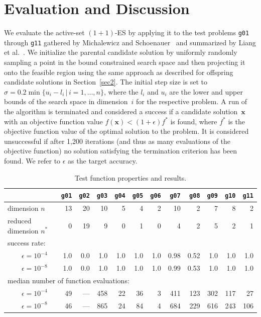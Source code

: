 \documentclass[oribibl]{llncs}
\newcommand{\x}{\ensuremath{\mathbf{x}}}
\begin{document}
\section{\label{sec3}Evaluation and Discussion}

We evaluate the active-set $(1+1)$-ES by applying it to the test problems \texttt{g01} through \texttt{g11} gathered by Michalewicz and Schoenauer~\cite{MS96} and summarized by Liang et al.~\cite{CEC06}. We initialize the parental candidate solution by uniformly randomly sampling a point in the bound constrained search space and then projecting it onto the feasible region using the same approach as described for offspring candidate solutions in Section~\ref{sec2}. The initial step size is set to $\sigma=0.2\min\{u_i-l_i\,|\,i=1,\dots,n\}$, where the $l_i$ and $u_i$ are the lower and upper bounds of the search space in dimension~$i$ for the respective problem. A run of the algorithm is terminated and considered a success if a candidate solution~$\x$ with an objective function value $f(\x)<(1+\epsilon)f^*$ is found, where $f^*$ is the objective function value of the optimal solution to the problem. It is considered unsuccessful if after 1,{}200 iterations (and thus as many evaluations of the objective function) no solution satisfying the termination criterion has been found. We refer to $\epsilon$ as the target accuracy.

\begin{table}[t]
  \caption{\label{tab.results}Test function properties and results.}
  \centering
  \begin{tabular}{lrrrrrrrrrrr}
    & \texttt{g01}
    & \texttt{g02} 
    & \texttt{g03} 
    & \texttt{g04} 
    & \texttt{g05} 
    & \texttt{g06} 
    & \texttt{g07} 
    & \texttt{g08} 
    & \texttt{g09} 
    & \texttt{g10} 
    & \texttt{g11}\\
    \hline
    dimension $n$
      & 13 & 20 & 10 & 5 & 4 & 2 & 10 & 2 & 7 & 8 & 2\\
    reduced dimension $n^*$
      &  0 & 19 &  9 & 0 & 1 & 0 &  4 & 2 & 5 & 2 & 1\\
    \hline
    success rate:\\
    \ \ \ \ $\epsilon=10^{-4}$
      & 1.0 & 0.0 & 1.0 & 1.0 & 1.0 & 1.0 & 0.98 & 0.52 & 1.0 & 1.0 & 1.0\\
    \ \ \ \ $\epsilon=10^{-8}$
      & 1.0 & 0.0 & 1.0 & 1.0 & 1.0 & 1.0 & 0.99 & 0.53 & 1.0 & 1.0 & 1.0\\
    \hline
    \multicolumn{10}{l}{median number of function evaluations:}\\
    \ \ \ \ $\epsilon=10^{-4}$
      & 49 & --- & 458 & 22 & 36 & 3 & 411 & 123 & 302 & 117 & 27\\
    \ \ \ \ $\epsilon=10^{-8}$
      & 46 & --- & 865 & 24 & 84 & 4 & 684 & 229 & 616 & 243 & 106\\
      \hline
  \end{tabular}
\end{table}
\end{document}
